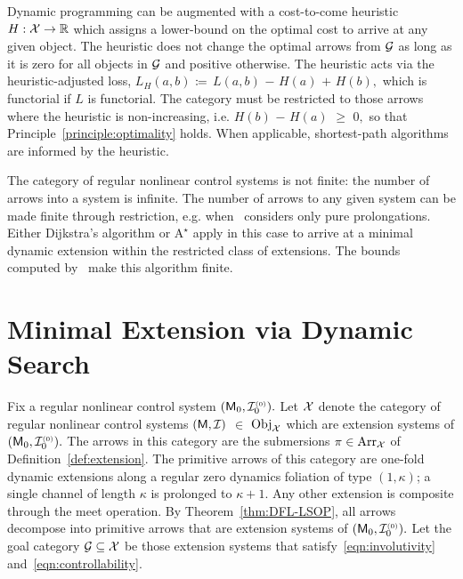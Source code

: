 \documentclass[a4paper]{ifacconf}
\begin{document}
Dynamic programming can be augmented with a cost-to-come heuristic \(H: \mathcal{X} \to \mathbb{R}\) which assigns a lower-bound on the optimal cost to arrive at any given object.
The heuristic does not change the optimal arrows from \(\mathcal{G}\) as long as it is zero for all objects in \(\mathcal{G}\) and positive otherwise.
The heuristic acts via the heuristic-adjusted loss, \(L_H(a, b)\) \(\coloneq\) \(L(a, b)\) \(-\) \(H(a)\) \(+\) \(H(b),\) which is functorial if \(L\) is functorial.
The category must be restricted to those arrows where the heuristic is non-increasing, i.e. \(H(b)\) \(-\) \(H(a)\) \(\geq\) \(0,\) so that Principle~\ref{principle:optimality} holds.
When applicable, shortest-path algorithms are informed by the heuristic.

The category of regular nonlinear control systems is not finite:
the number of arrows into a system is infinite.
The number of arrows to any given system can be made finite through restriction, e.g. when~\cite{levine_differential_2025-1} considers only pure prolongations.
Either Dijkstra's algorithm or \(\text{A}^\star\) apply in this case to arrive at a minimal dynamic extension within the restricted class of extensions.
The bounds computed by~\cite{guay_condition_1997} make this algorithm finite.

\section{Minimal Extension via Dynamic Search}
\label{section:deds}
Fix a regular nonlinear control system \((\mathsf{M}_0, \mathcal{I}_0^{\smash{\scriptscriptstyle(0)}}).\)
Let \(\mathcal{X}\) denote the category of regular nonlinear control systems \((\mathsf{M}, \mathcal{I})\) \(\in\) \(\mathrm{Obj}_{\mathcal{X}}\) which are extension systems of \((\mathsf{M}_0, \mathcal{I}_0^{\smash{\scriptscriptstyle(0)}}).\)
The arrows in this category are the submersions \(\pi \in \mathrm{Arr}_{\mathcal{X}}\) of Definition~\ref{def:extension}.
The primitive arrows of this category are one-fold dynamic extensions along a regular zero dynamics foliation of type \((1, \kappa)\);
a single channel of length \(\kappa\) is prolonged to \(\kappa+1\).
Any other extension is composite through the meet operation.
By Theorem~\ref{thm:DFL-LSOP}, all arrows decompose into primitive arrows that are extension systems of \((\mathsf{M}_0, \mathcal{I}_0^{\smash{\scriptscriptstyle(0)}}).\)
Let the goal category \(\mathcal{G} \subseteq \mathcal{X}\) be those extension systems that satisfy~\eqref{eqn:involutivity} and~\eqref{eqn:controllability}.
\end{document}
